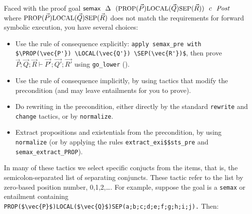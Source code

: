 \documentclass[12pt,fleqn,openany,oneside,showtrims]{memoir}
\begin{document}
Faced with the proof goal 
$\mathsf{semax}~~\Delta~~(\mbox{\small PROP}(\vec{P}) \mbox{\small LOCAL}(\vec{Q}) \mbox{\small SEP}(\vec{R}))~~c~~\mathit{Post}$
where $\mbox{\small PROP}(\vec{P}) \mbox{\small LOCAL}(\vec{Q}) \mbox{\small SEP}(\vec{R})$ does not match
the requirements for forward symbolic execution,
you have several choices:
\begin{itemize}
\item Use the rule of consequence explicitly:\newline
\lstinline|apply semax_pre with $\PROP(\vec{P'}) \LOCAL(\vec{Q'}) \SEP(\vec{R'})$|,\newline
then prove $\vec{P};\vec{Q};\vec{R}\vdash\vec{P'};\vec{Q'};\vec{R'}$ using 
\lstinline{go_lower} ().
\item Use the rule of consequence implicitly,
by using tactics that modify the precondition
(and may leave entailments for you to prove).
\item Do rewriting in the precondition, either directly by the
standard \lstinline{rewrite} and \lstinline{change} tactics,
or by \lstinline{normalize}.
\item Extract propositions and existentials from the precondition,
by using \lstinline{normalize}
(or by applying the rules \lstinline{extract_exi$$sts_pre}
and \lstinline{semax_extract_PROP}).
\end{itemize}



In many of these tactics we select specific conjucts from the
\SEP{} items, that is, the semicolon-separated list of
separating conjuncts.  These tactic refer to the list
by zero-based position number, 0,1,2,\ldots.
\pagebreak
For example, suppose the goal is a \lstinline{semax}
or entailment containing \lstinline|PROP($\vec{P}$)LOCAL($\vec{Q}$)SEP(a;b;c;d;e;f;g;h;i;j).|
Then:
\end{document}
